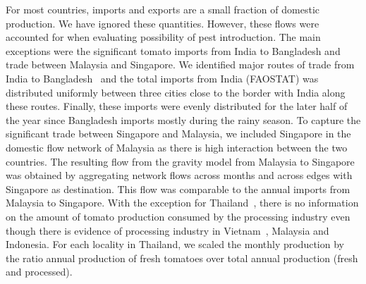 \documentclass[11pt]{article}
\theoremstyle{definition}
\begin{document}
For most countries, imports and exports are a small fraction of domestic
production. We have ignored these quantities.  However, these flows were
accounted for when evaluating possibility of pest introduction. The main
exceptions were the significant tomato imports from India to Bangladesh and
trade between Malaysia and Singapore. We identified major routes of trade
from India to Bangladesh~\cite{EIIndia2015} and the total imports from
India (FAOSTAT) was distributed uniformly between three cities close to the
border with India along these routes. Finally, these imports were evenly
distributed for the later half of the year since Bangladesh imports mostly
during the rainy season. To capture the significant trade between Singapore
and Malaysia, we included Singapore in the domestic flow network of
Malaysia as there is high interaction between the two countries.  The
resulting flow from the gravity model from Malaysia to Singapore was
obtained by aggregating network flows across months and across edges with
Singapore as destination.  This flow was comparable to the annual imports
from Malaysia to Singapore. With the exception for
Thailand~\cite{mict2013}, there is no information on the amount of tomato
production consumed by the processing industry even though there is
evidence of processing industry in Vietnam~\cite{wijk2007}, Malaysia and
Indonesia. For each locality in Thailand, we scaled the monthly production
by the ratio annual production of fresh tomatoes over total annual
production (fresh and processed).
\end{document}
